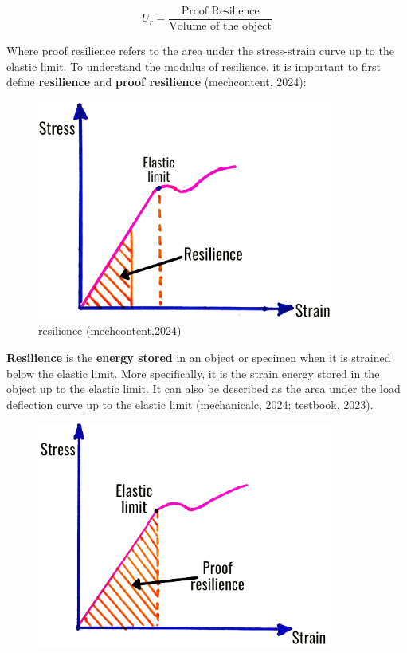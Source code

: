 \documentclass{article}
\begin{document}
{\begin{equation}
    U_r = \frac{\text{Proof Resilience}}{\text{Volume of the object}}
\end{equation}

Where proof resilience refers to the area under the stress-strain curve up to the elastic limit. To understand the modulus of resilience, it is important to first define \textbf{resilience} and \textbf{proof resilience} (mechcontent, 2024):

\begin{center}
\begin{minipage}[t]{0.46\textwidth}
\begin{figure}[H]
    \centering
    \includegraphics[width=0.87\textwidth]{images/resilience-1.png}
    \caption{resilience (mechcontent,2024)}
    \label{fig:resilience}
\end{figure}
\textbf{Resilience} is the \textbf{energy stored} in an object or specimen when it is strained below the elastic limit. More specifically, it is the strain energy stored in the object up to the elastic limit. It can also be described as the area under the load deflection curve up to the elastic limit (mechanicalc, 2024; testbook, 2023).
\end{minipage}\hfil
\begin{minipage}[t]{0.46\textwidth}
\begin{figure}[H]
    \centering
    \includegraphics[width=0.87\textwidth]{images/proof-resilience-1.png}

\end{figure}
\end{minipage}
\end{center}}
\end{document}
